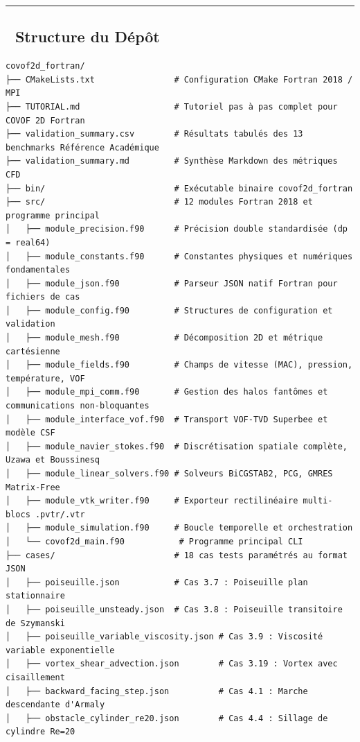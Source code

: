 \documentclass[
  french,
]{article}
\begin{document}
\begin{center}\rule{0.5\linewidth}{0.5pt}\end{center}

\subsection{📁 Structure du Dépôt}\label{structure-du-duxe9puxf4t}

\begin{verbatim}
covof2d_fortran/
├── CMakeLists.txt                # Configuration CMake Fortran 2018 / MPI
├── TUTORIAL.md                   # Tutoriel pas à pas complet pour COVOF 2D Fortran
├── validation_summary.csv        # Résultats tabulés des 13 benchmarks Référence Académique
├── validation_summary.md         # Synthèse Markdown des métriques CFD
├── bin/                          # Exécutable binaire covof2d_fortran
├── src/                          # 12 modules Fortran 2018 et programme principal
│   ├── module_precision.f90      # Précision double standardisée (dp = real64)
│   ├── module_constants.f90      # Constantes physiques et numériques fondamentales
│   ├── module_json.f90           # Parseur JSON natif Fortran pour fichiers de cas
│   ├── module_config.f90         # Structures de configuration et validation
│   ├── module_mesh.f90           # Décomposition 2D et métrique cartésienne
│   ├── module_fields.f90         # Champs de vitesse (MAC), pression, température, VOF
│   ├── module_mpi_comm.f90       # Gestion des halos fantômes et communications non-bloquantes
│   ├── module_interface_vof.f90  # Transport VOF-TVD Superbee et modèle CSF
│   ├── module_navier_stokes.f90  # Discrétisation spatiale complète, Uzawa et Boussinesq
│   ├── module_linear_solvers.f90 # Solveurs BiCGSTAB2, PCG, GMRES Matrix-Free
│   ├── module_vtk_writer.f90     # Exporteur rectilinéaire multi-blocs .pvtr/.vtr
│   ├── module_simulation.f90     # Boucle temporelle et orchestration
│   └── covof2d_main.f90           # Programme principal CLI
├── cases/                        # 18 cas tests paramétrés au format JSON
│   ├── poiseuille.json           # Cas 3.7 : Poiseuille plan stationnaire
│   ├── poiseuille_unsteady.json  # Cas 3.8 : Poiseuille transitoire de Szymanski
│   ├── poiseuille_variable_viscosity.json # Cas 3.9 : Viscosité variable exponentielle
│   ├── vortex_shear_advection.json        # Cas 3.19 : Vortex avec cisaillement
│   ├── backward_facing_step.json          # Cas 4.1 : Marche descendante d'Armaly
│   ├── obstacle_cylinder_re20.json        # Cas 4.4 : Sillage de cylindre Re=20

\end{verbatim}
\end{document}
